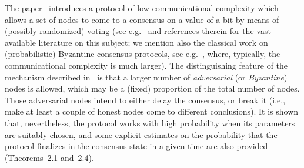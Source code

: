 \documentclass[../main.tex]{subfiles}
\begin{document}
The paper~\cite{popov2019} introduces a protocol 
of low communicational complexity
which allows a set of nodes to come to a 
consensus on a value of a bit by means 
of (possibly randomized) voting
(see e.g.\ \cite{Becchetti2016,cooper2014,cooper2015, elsasser2016,fanti2019,mallmann2017}
and references therein for the vast available literature 
on this subject; we mention also the classical work on (probabilistic)
Byzantine consensus protocols,
see e.g.~\cite{AguTou12, Ben83, Bra87, CasLis02, 
FelMic89, FriMosRay04, Rab83}, where,
typically, the communicational complexity is much larger).
The distinguishing feature of the mechanism described in~\cite{popov2019}
is that a larger number of
\emph{adversarial} (or \emph{Byzantine})
 nodes is allowed, which may be a (fixed)
proportion of the total number of nodes.
Those adversarial nodes 
intend to either delay the consensus,
or break it (i.e., make at least a couple of honest nodes
come to different conclusions).
 It is shown that,
nevertheless, the protocol works with high probability
 when its parameters
 are suitably chosen, and  
some explicit estimates on the probability 
that the protocol finalizes in the consensus state
in a given time are also provided (Theorems~2.1
and~2.4).
\end{document}
